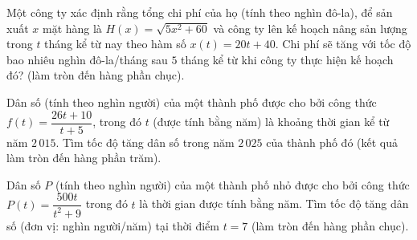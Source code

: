 \begin{ex}%
	Một công ty xác định rằng tổng chi phí của họ (tính theo nghìn đô-la), để sản xuất $x$ mặt hàng là $H(x)=\sqrt{5x^2+60}$ và công ty lên kế hoạch nâng sản lượng trong $t$ tháng kể từ nay theo hàm số $x(t)=20t+40$. Chi phí sẽ tăng với tốc độ bao nhiêu nghìn đô-la/tháng sau $ 5 $ tháng  kể từ khi công ty thực hiện kế hoạch đó? (làm tròn đến hàng phần chục).
\end{ex}

\begin{ex}%
	Dân số (tính theo nghìn người) của một thành phố được cho bởi công thức $f(t)=\dfrac{26t+10}{t+5}$, trong đó $t$ (được tính bằng  năm) là khoảng thời gian kể từ năm $ 2\,015 $. Tìm tốc độ tăng dân số trong năm $ 2\,025 $ của thành phố đó (kết quả làm tròn đến hàng phần trăm).
\end{ex}

\begin{ex}%
	Dân số $P$ (tính theo nghìn người) của một thành phố nhỏ được cho bởi công thức $P(t)=\dfrac{500t}{t^2+9}$ trong đó $t$ là thời gian được tính  bằng năm. Tìm tốc độ tăng dân số (đơn vị: nghìn người/năm) tại thời điểm $t=7$ (làm tròn đến hàng phần chục).
\end{ex}

